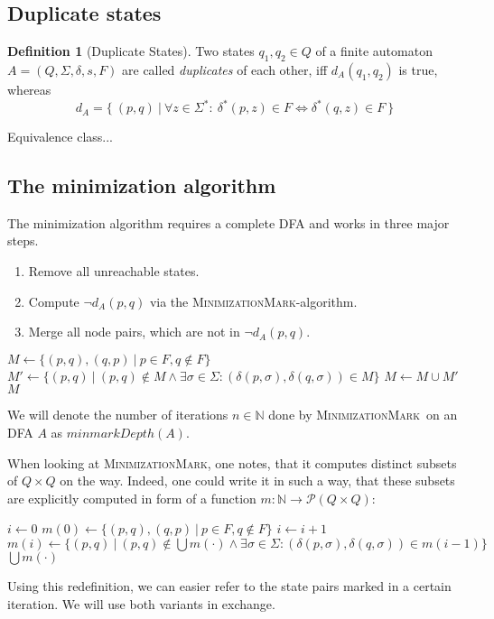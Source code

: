 \documentclass[a4paper, oneside, 11pt]{report}
\theoremstyle{definition}
\newtheorem{definition}{Definition}
\theoremstyle{remark}
\newcommand{\MinMark}{\textsc{MinimizationMark}}
\begin{document}
\subsection{Duplicate states}

\begin{definition}[Duplicate States]
	Two states $q_1, q_2 \in Q$ of a finite automaton $A = (Q, \Sigma, \delta, s, F)$ are called \emph{duplicates} of each other, iff $d_A(q_1, q_2)$ is true, whereas
	\[
		d_A = \{\ (p, q)\ |\ \forall z \in \Sigma^* \colon\ \delta^*(p, z) \in F \Leftrightarrow \delta^*(q, z) \in F\ \}
	\]
\end{definition}

Equivalence class...

\subsection{The minimization algorithm}

The minimization algorithm requires a complete DFA and works in three major steps.
\begin{enumerate}
	\item Remove all unreachable states.
	\item Compute $\neg d_A(p, q)$ via the \MinMark-algorithm.
	\item Merge all node pairs, which are not in $\neg d_A(p, q)$.
\end{enumerate}

\begin{algorithmic}[1]
	\State $M \gets \{ (p,q), (q,p)\ |\ p \in F, q \notin F \}$
	\Do
		\State $M' \gets \{ (p,q)\ |\ (p,q) \notin M \land \exists \sigma \in \Sigma \colon (\delta(p,\sigma), \delta(q,\sigma)) \in M \}$
		\State $M \gets M \cup M'$
	\State \Return $M$
	\EndFunction
\end{algorithmic}
\vspace{0.2cm}
We will denote the number of iterations $n \in \mathbb{N}$ done by \MinMark\ on an DFA $A$ as $minmarkDepth(A)$.

When looking at \MinMark, one notes, that it computes distinct subsets of $Q \times Q$ on the way. Indeed, one could write it in such a way, that these subsets are explicitly computed in form of a function $m\colon\mathbb{N}\to\mathcal{P}(Q\times Q)$:
\vspace{0.2cm}
\begin{algorithmic}[1]
	\State $i \gets 0$
	\State $m(0) \gets \{ (p,q), (q,p)\ |\ p \in F, q \notin F \}$
	\Do
		\State $i \gets i + 1$
		\State $m(i) \gets \{ (p,q)\ |\ (p,q) \notin \bigcup{m(\cdot)} \land \exists \sigma \in \Sigma \colon (\delta(p,\sigma), \delta(q,\sigma)) \in m(i-1) \}$
	\State \Return $\bigcup{m(\cdot)}$
	\EndFunction
\end{algorithmic}
\vspace{0.2cm}
Using this redefinition, we can easier refer to the state pairs marked in a certain iteration. We will use both variants in exchange.
\end{document}
